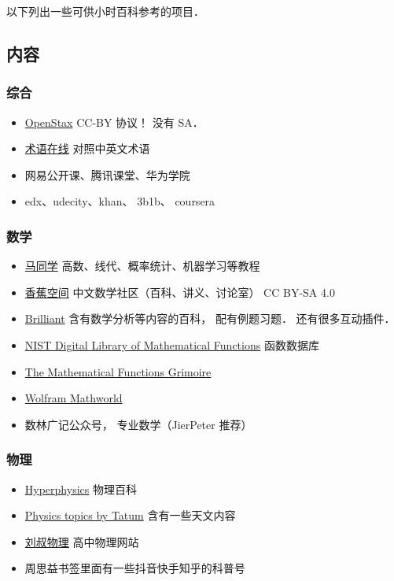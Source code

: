 
以下列出一些可供小时百科参考的项目．

\subsection{内容}
\subsubsection{综合}
\begin{itemize}
\item \href{https://openstax.org/}{OpenStax} CC-BY 协议！ 没有 SA．
\item \href{https://www.termonline.cn/index}{术语在线} 对照中英文术语
\item 网易公开课、腾讯课堂、华为学院
\item edx、udecity、khan、 3b1b、 coursera
\end{itemize}
\subsubsection{数学}
\begin{itemize}
\item \href{https://www.matongxue.com/}{马同学} 高数、线代、概率统计、机器学习等教程
\item \href{https://www.bananaspace.org/wiki/}{香蕉空间} 中文数学社区（百科、讲义、讨论室） CC BY-SA 4.0
\item \href{https://brilliant.org/}{Brilliant} 含有数学分析等内容的百科， 配有例题习题． 还有很多互动插件．
\item \href{https://dlmf.nist.gov/}{NIST Digital Library of Mathematical Functions} 函数数据库
\item \href{https://fungrim.org/}{The Mathematical Functions Grimoire}
\item \href{https://mathworld.wolfram.com/}{Wolfram Mathworld}
\item 数林广记公众号， 专业数学（JierPeter 推荐）
\end{itemize}
\subsubsection{物理}
\begin{itemize}
\item \href{http://hyperphysics.phy-astr.gsu.edu/}{Hyperphysics} 物理百科
\item \href{http://www.astro.uvic.ca/~tatum/index.php}{Physics topics by Tatum} 含有一些天文内容
\item \href{http://www.myliushu.com/}{刘叔物理} 高中物理网站
\item 周思益书签里面有一些抖音快手知乎的科普号
\end{itemize}
